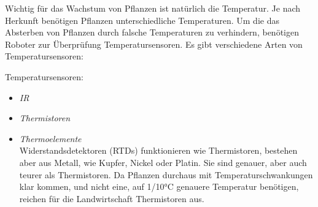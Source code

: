Wichtig für das Wachstum von Pflanzen ist natürlich die Temperatur. Je nach
Herkunft benötigen Pflanzen unterschiedliche Temperaturen. Um die das Absterben
von Pflanzen durch falsche Temperaturen zu verhindern, benötigen Roboter zur
Überprüfung Temperatursensoren. Es gibt verschiedene Arten von
Temperatursensoren:

\begin{description}
	\item {Temperatursensoren:}
	      \begin{itemize}
		      \item {\textit{IR}}\\
					
		      \item {\textit{Thermistoren}}\\
		            
		      \item {\textit{Thermoelemente}}\\
		            Widerstandsdetektoren (RTDs) funktionieren wie Thermistoren, bestehen aber aus Metall, wie Kupfer, Nickel oder Platin. Sie sind genauer, aber auch teurer als Thermistoren. Da Pflanzen durchaus mit Temperaturschwankungen klar kommen, und nicht eine, auf 1/10°C genauere Temperatur benötigen, reichen für die Landwirtschaft Thermistoren aus.
	      \end{itemize}
\end{description}
